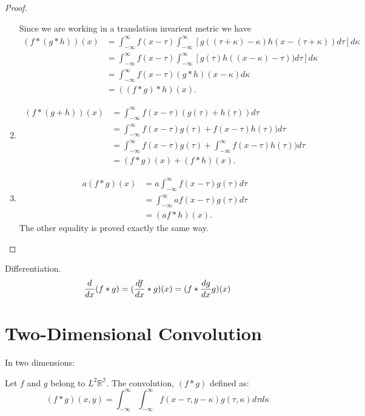 \begin{proof}
\begin{enumerate}
			Since we are working in a translation invarient metric we have
			\begin{equation*}\begin{array}{rl}
				(f*(g*h))(x)&=\int_{-\infty}^\infty f(x-\tau)\int_{-\infty}^\infty[g((\tau+\kappa)-\kappa)h(x-(\tau+\kappa))d\tau]d\kappa\\
				&=\int_{-\infty}^\infty f(x-\tau)\int_{-\infty}^\infty[g(\tau)h((x-\kappa)-\tau))d\tau]d\kappa\\
				&=\int_{-\infty}^\infty f(x-\tau)(g*h)(x-\kappa)d\kappa\\
				&=((f*g)*h)(x).
			\end{array}\end{equation*}
		\item
			\begin{equation*}\begin{array}{rl}
				(f*(g+h))(x)&=\int_{-\infty}^\infty f(x-\tau)(g(\tau)+h(\tau))d\tau\\
				&=\int_{-\infty}^\infty f(x-\tau)g(\tau)+f(x-\tau)h(\tau))d\tau\\
				&=\int_{-\infty}^\infty f(x-\tau)g(\tau)+\int_{-\infty}^\infty f(x-\tau)h(\tau))d\tau\\
				&=(f*g)(x)+(f*h)(x).
			\end{array}\end{equation*}
		\item
			\begin{equation*}\begin{array}{rl}
				a(f*g)(x)&=a\int_{-\infty}^\infty f(x-\tau)g(\tau)d\tau\\
				&=\int_{-\infty}^\infty af(x-\tau)g(\tau)d\tau\\
				&=(af*h)(x).
			\end{array}\end{equation*}
			The other equality is proved exactly the same way.
		\end{enumerate}
	\end{proof}
	
	Differentiation.
	\begin{equation*}\index{convolution!derivative 1D}
		\frac{d}{dx}(f*g)=(\frac{df}{dx}*g)(x)=(f*\frac{dg}{dx}g)(x)
	\end{equation*}
	
	
\section{Two-Dimensional Convolution}
	In two dimensions:
	\begin{dfn}
		Let $f$ and $g$ belong to $L^2{\mathbb{R^2}}$. The convolution, $(f*g)$ defined as:
		\begin{equation}\label{def_convolve_2D}
			(f*g)(x,y)=\int_{-\infty}^\infty\int_{-\infty}^\infty f(x-\tau,y-\kappa)g(\tau,\kappa)d\tau d\kappa
		\end{equation}
	\end{dfn}
	
